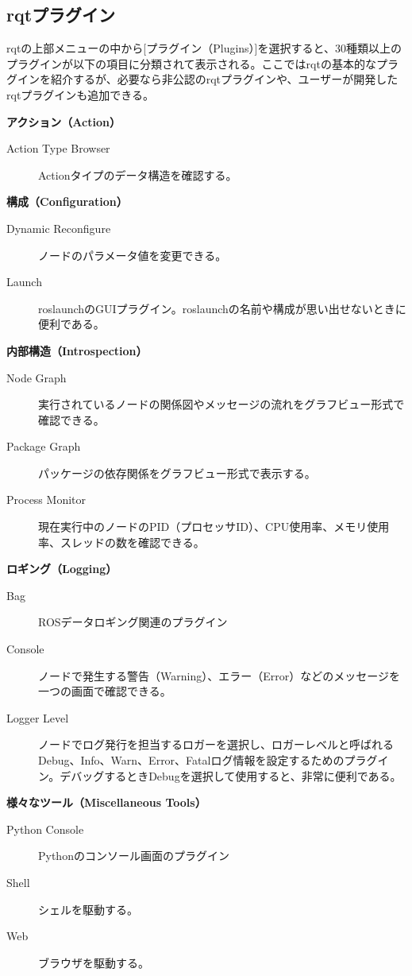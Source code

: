 \subsection{rqtプラグイン}

rqtの上部メニューの中から[プラグイン（Plugins）]を選択すると、30種類以上のプラグインが以下の項目に分類されて表示される。ここではrqtの基本的なプラグインを紹介するが、必要なら非公認のrqtプラグインや、ユーザーが開発したrqtプラグインも追加できる。

\textbf{アクション（Action）}
\begin{description}
\item  [Action Type Browser] Actionタイプのデータ構造を確認する。
\end{description}

\textbf{構成（Configuration）}
\begin{description}
\item  [Dynamic Reconfigure] ノードのパラメータ値を変更できる。
\item  [Launch] roslaunchのGUIプラグイン。roslaunchの名前や構成が思い出せないときに便利である。
\end{description}

\textbf{内部構造（Introspection）}
\begin{description}
\item  [Node Graph] 実行されているノードの関係図やメッセージの流れをグラフビュー形式で確認できる。
\item  [Package Graph] パッケージの依存関係をグラフビュー形式で表示する。
\item  [Process Monitor] 現在実行中のノードのPID（プロセッサID）、CPU使用率、メモリ使用率、スレッドの数を確認できる。
\end{description}

\textbf{ロギング（Logging）}
\begin{description}
\item  [Bag] ROSデータロギング関連のプラグイン
\item  [Console] ノードで発生する警告（Warning）、エラー（Error）などのメッセージを一つの画面で確認できる。
\item  [Logger Level] ノードでログ発行を担当するロガーを選択し、ロガーレベルと呼ばれるDebug、Info、Warn、Error、Fatalログ情報を設定するためのプラグイン。デバッグするときDebugを選択して使用すると、非常に便利である。
\end{description}

\textbf{様々なツール（Miscellaneous Tools）}
\begin{description}
\item  [Python Console] Pythonのコンソール画面のプラグイン
\item  [Shell] シェルを駆動する。
\item  [Web] ブラウザを駆動する。
\end{description}

